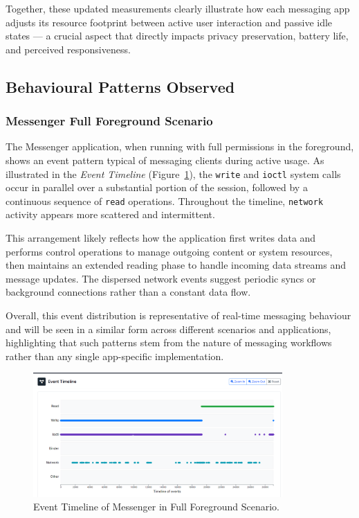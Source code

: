 \documentclass[a4paper,12pt]{report}
\begin{document}
Together, these updated measurements clearly illustrate how each messaging app adjusts its resource footprint between active user interaction and passive idle states — a crucial aspect that directly impacts privacy preservation, battery life, and perceived responsiveness.

\subsection{Behavioural Patterns Observed}


\subsubsection{Messenger Full Foreground Scenario}

The Messenger application, when running with full permissions in the foreground, shows an event pattern typical of messaging clients during active usage. As illustrated in the \textit{Event Timeline} (Figure~\ref{fig:messenger-full-events}), the \texttt{write} and \texttt{ioctl} system calls occur in parallel over a substantial portion of the session, followed by a continuous sequence of \texttt{read} operations. Throughout the timeline, \texttt{network} activity appears more scattered and intermittent.

This arrangement likely reflects how the application first writes data and performs control operations to manage outgoing content or system resources, then maintains an extended reading phase to handle incoming data streams and message updates. The dispersed network events suggest periodic syncs or background connections rather than a constant data flow.

Overall, this event distribution is representative of real-time messaging behaviour and will be seen in a similar form across different scenarios and applications, highlighting that such patterns stem from the nature of messaging workflows rather than any single app-specific implementation.

\begin{figure}[H]
    \centering
    \includegraphics[width=0.85\textwidth]{messenger-full-events.png}
    \caption{Event Timeline of Messenger in Full Foreground Scenario.}
    \label{fig:messenger-full-events}
\end{figure}
\end{document}
